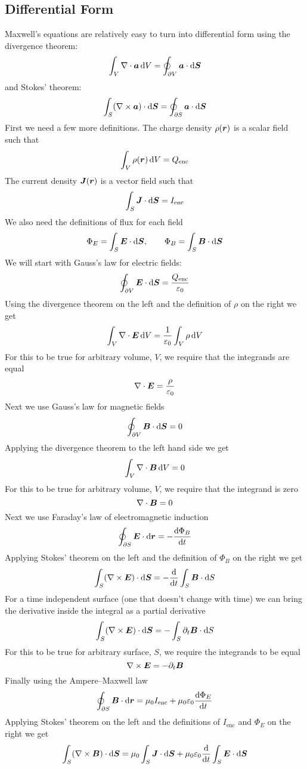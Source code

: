 \documentclass{article}
\begin{document}
    \subsection{Differential Form}
    Maxwell's equations are relatively easy to turn into differential form using the divergence theorem:
    \[\int_V\nabla\cdot\bm{a}\,\dd V = \oint_{\partial V}\bm{a}\cdot\dd\bm{S}\]
    and Stokes' theorem:
    \[\int_S(\nabla\times\bm{a})\cdot\dd\bm{S} = \oint_{\partial S}\bm{a}\cdot\dd\bm{S}\]
    First we need a few more definitions.
    The charge density \(\rho(\bm{r})\) is a scalar field such that
    \[\int_V\rho(\bm{r})\,\dd V = Q_\text{enc}\]
    The current density \(\bm{J}(\bm{r})\) is a vector field such that
    \[\int_S\bm{J}\cdot\dd\bm{S} = I_\text{enc}\]
    We also need the definitions of flux for each field
    \[\Phi_E = \int_S\bm{E}\cdot\dd\bm{S},\qquad \Phi_B = \int_S\bm{B}\cdot\dd\bm{S}\]
    We will start with Gauss's law for electric fields:
    \[\oint_{\partial V}\bm{E}\cdot\dd\bm{S} = \frac{Q_\text{enc}}{\varepsilon_0}\]
    Using the divergence theorem on the left and the definition of \(\rho\) on the right we get
    \[\int_V\nabla\cdot\bm{E}\,\dd V = \frac{1}{\varepsilon_0}\int_V\rho\,\dd V\]
    For this to be true for arbitrary volume, \(V\), we require that the integrands are equal
    \[\nabla\cdot\bm{E} = \frac{\rho}{\varepsilon_0}\]
    Next we use Gauss's law for magnetic fields
    \[\oint_{\partial V}\bm{B}\cdot\dd\bm{S} = 0\]
    Applying the divergence theorem to the left hand side we get
    \[\int_V\nabla\cdot\bm{B}\,\dd V = 0\]
    For this to be true for arbitrary volume, \(V\), we require that the integrand is zero
    \[\nabla\cdot\bm{B} = 0\]
    Next we use Faraday's law of electromagnetic induction
    \[\oint_{\partial S}\bm{E}\cdot\dd\bm{r} = -\dv{\Phi_B}{t}\]
    Applying Stokes' theorem on the left and the definition of \(\Phi_B\) on the right we get
    \[\int_S(\nabla\times\bm{E})\cdot\dd\bm{S} = -\dv{t}\int_S\bm{B}\cdot\dd S\]
    For a time independent surface (one that doesn't change with time) we can bring the derivative inside the integral as a partial derivative
    \[\int_S(\nabla\times\bm{E})\cdot\dd\bm{S} = -\int_S\partial_t\bm{B}\cdot\dd S\]
    For this to be true for arbitrary surface, \(S\), we require the integrands to be equal
    \[\nabla\times\bm{E} = -\partial_t \bm{B}\]
    Finally using the Ampere--Maxwell law
    \[\oint_{\partial S}\bm{B}\cdot\dd\bm{r} = \mu_0I_\text{enc} + \mu_0\varepsilon_0\dv{\Phi_E}{t}\]
    Applying Stokes' theorem on the left and the definitions of \(I_\text{enc}\) and \(\Phi_E\) on the right we get
    \[\int_S(\nabla\times\bm{B})\cdot\dd\bm{S} = \mu_0\int_S\bm{J}\cdot\dd\bm{S} + \mu_0\varepsilon_0\dv{t}\int_S\bm{E}\cdot\dd\bm{S}\]
\end{document}
